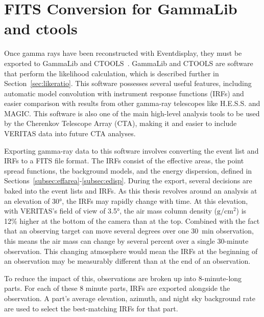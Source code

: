 \section{FITS Conversion for GammaLib and ctools}\label{fitsconversion}
Once gamma rays have been reconstructed with Eventdisplay, they must be exported to GammaLib and CTOOLS~\cite{gammalibctools}.
GammaLib and CTOOLS are software that perform the likelihood calculation, which is described further in Section~\ref{sec:likeratio}.
This software possesses several useful features, including automatic model convolution with instrument response functions (IRFs) and easier comparison with results from other gamma-ray telescopes like H.E.S.S. and MAGIC.
This software is also one of the main high-level analysis tools to be used by the Cherenkov Telescope Array (CTA), making it and easier to include VERITAS data into future CTA analyses.

Exporting gamma-ray data to this software involves converting the event list and IRFs to a FITS file format.
The IRFs consist of the effective areas, the point spread functions, the background models, and the energy dispersion, defined in Sections~\ref{subsec:effarea}-\ref{subsec:edisp}.
During the export, several decisions are baked into the event lists and IRFs.
As this thesis revolves around an analysis at an elevation of \nicetilde{}\ang{30}, the IRFs may rapidly change with time.
At this elevation, with VERITAS's field of view of \ang{3.5}, the air mass column density ($\textrm{g}/\textrm{cm}^2$) is 12\% higher at the bottom of the camera than at the top.
Combined with the fact that an observing target can move several degrees over one \SI{30}{min} observation, this means the air mass can change by several percent over a single 30-minute observation.
This changing atmosphere would mean the IRFs at the beginning of an observation may be measurably different than at the end of an observation.

To reduce the impact of this, observations are broken up into 8-minute-long parts.
For each of these 8 minute parts, IRFs are exported alongside the observation.
A part's average elevation, azimuth, and night sky background rate are used to select the best-matching IRFs for that part.

